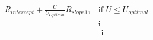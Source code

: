 \documentclass[preview]{standalone}
\begin{document}
\begin{align*}
R_{intercept} + \frac{U}{U_{Optimal}}R_{slope1}, & \text{if } U \leq U_{optimal} \\[6pt] & \text{i } \\ & \text{ i}
\end{align*}
\end{document}
